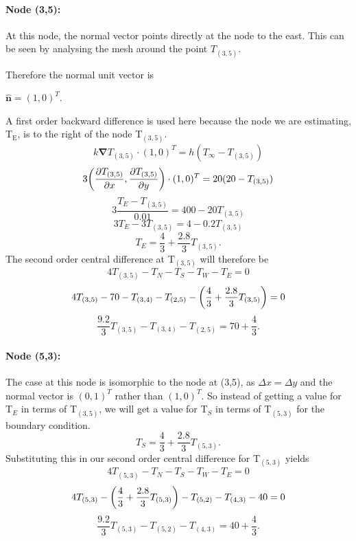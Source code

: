 \documentclass[12pt,a4paper]{article}
\begin{document}
\paragraph*{Node (3,5):} At this node, the normal vector points directly at the node to the east. This can be seen by analysing the mesh around the point $T_{(3,5)}$.
\begin{center}
\end{center}
Therefore the normal unit vector is 
\begin{center}
  $\hat{\textbf{n}}=(1,0)^T$.
\end{center}
A first order backward difference is used here because the node we are estimating, T$_\text{E}$, is to the right of the node T$_{(3,5)}$.
\[
  k\boldsymbol{\nabla}T_{(3,5)}\cdot(1,0)^T = h(T_{\infty} - T_{(3,5)})
\]
\[ 3\bigg{(}\frac{\partial T_{(3,5)}}{\partial x},\frac{\partial T_{(3,5)}}{\partial y}\bigg{)}\cdot(1,0)^T = 20(20 - T_{(3,5)})\]
\[3\frac{T_E-T_{(3,5)}}{0.01} = 400-20T_{(3,5)}\]
\[3T_E-3T_{(3,5)}=4-0.2T_{(3,5)}\]
\[T_E=\frac{4}{3}+\frac{2.8}{3}T_{(3,5)}.\]
The second order central difference at T$_{(3,5)}$ will therefore be 
\[4T_{(3,5)}-T_N-T_S-T_W-T_E=0\]
\[4T_{(3,5)}-70-T_{(3,4)}-T_{(2,5)}-\bigg{(}\frac{4}{3}+\frac{2.8}{3}T_{(3,5)}\bigg{)}=0\]
\[\frac{9.2}{3}T_{(3,5)}-T_{(3,4)}-T_{(2,5)}=70+\frac{4}{3}.\]
\paragraph*{Node (5,3):} The case at this node is isomorphic to the node at (3,5), as $\Delta x = \Delta y$ and the normal vector is $(0,1)^T$ rather than $(1,0)^T$. So instead of getting a value for T$_E$ in terms of T$_{(3,5)}$, we will get a value for T$_S$ in terms of T$_{(5,3)}$ for the boundary condition.
\[T_S=\frac{4}{3}+\frac{2.8}{3}T_{(5,3)}.\]
Substituting this in our second order central difference for T$_{(5,3)}$ yields
\[4T_{(5,3)}-T_N-T_S-T_W-T_E=0\]
\[4T_{(5,3)}-\bigg{(}\frac{4}{3}+\frac{2.8}{3}T_{(5,3)}\bigg{)}-T_{(5,2)}-T_{(4,3)}-40=0\]
\[\frac{9.2}{3}T_{(5,3)}-T_{(5,2)}-T_{(4,3)}=40+\frac{4}{3}.\]
\end{document}
